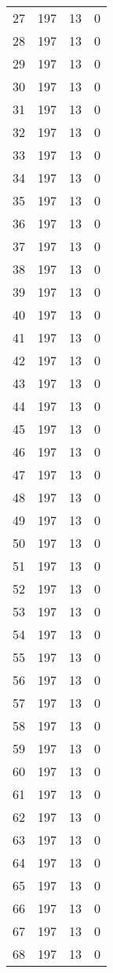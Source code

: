 \begin{longtable}[!]{c|ccc}
	27	& 197	& 13	& 0	\\
	28	& 197	& 13	& 0	\\
	29	& 197	& 13	& 0	\\
	30	& 197	& 13	& 0	\\
	31	& 197	& 13	& 0	\\
	32	& 197	& 13	& 0	\\
	33	& 197	& 13	& 0	\\
	34	& 197	& 13	& 0	\\
	35	& 197	& 13	& 0	\\
	36	& 197	& 13	& 0	\\
	37	& 197	& 13	& 0	\\
	38	& 197	& 13	& 0	\\
	39	& 197	& 13	& 0	\\
	40	& 197	& 13	& 0	\\
	41	& 197	& 13	& 0	\\
	42	& 197	& 13	& 0	\\
	43	& 197	& 13	& 0	\\
	44	& 197	& 13	& 0	\\
	45	& 197	& 13	& 0	\\
	46	& 197	& 13	& 0	\\
	47	& 197	& 13	& 0	\\
	48	& 197	& 13	& 0	\\
	49	& 197	& 13	& 0	\\
	50	& 197	& 13	& 0	\\
	51	& 197	& 13	& 0	\\
	52	& 197	& 13	& 0	\\
	53	& 197	& 13	& 0	\\
	54	& 197	& 13	& 0	\\
	55	& 197	& 13	& 0	\\
	56	& 197	& 13	& 0	\\
	57	& 197	& 13	& 0	\\
	58	& 197	& 13	& 0	\\
	59	& 197	& 13	& 0	\\
	60	& 197	& 13	& 0	\\
	61	& 197	& 13	& 0	\\
	62	& 197	& 13	& 0	\\
	63	& 197	& 13	& 0	\\
	64	& 197	& 13	& 0	\\
	65	& 197	& 13	& 0	\\
	66	& 197	& 13	& 0	\\
	67	& 197	& 13	& 0	\\
	68	& 197	& 13	& 0	\\

\end{longtable}
